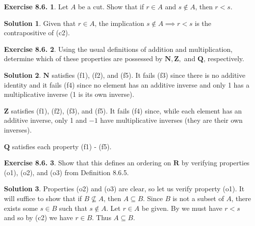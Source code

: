 \documentclass[12pt]{article}
\theoremstyle{definition}
\theoremstyle{exercise}
\newtheorem{exercise}{Exercise 8.6.}
\theoremstyle{solution}
\newtheorem*{solution}{Solution}
\newcommand{\N}{\mathbf{N}}
\newcommand{\Z}{\mathbf{Z}}
\newcommand{\Q}{\mathbf{Q}}
\newcommand{\R}{\mathbf{R}}
\begin{document}
\begin{exercise}
\label{ex:2}
    Let \( A \) be a cut. Show that if \( r \in A \) and \( s \not\in A \), then \( r < s \).
\end{exercise}

\begin{solution}
    Given that \( r \in A \), the implication \( s \not\in A \implies r < s \) is the contrapositive of (c2).
\end{solution}

\begin{exercise}
\label{ex:3}
    Using the usual definitions of addition and multiplication, determine which of these properties are possessed by \( \N, \Z, \) and \( \Q \), respectively.
\end{exercise}

\begin{solution}
    \( \N \) satisfies (f1), (f2), and (f5). It fails (f3) since there is no additive identity and it fails (f4) since no element has an additive inverse and only 1 has a multiplicative inverse (1 is its own inverse).

    \( \Z \) satisfies (f1), (f2), (f3), and (f5). It fails (f4) since, while each element has an additive inverse, only 1 and \( -1 \) have multiplicative inverses (they are their own inverses).

    \( \Q \) satisfies each property (f1) - (f5).
\end{solution}

\begin{exercise}
\label{ex:4}
    Show that this defines an ordering on \( \R \) by verifying properties (o1), (o2), and (o3) from Definition 8.6.5.
\end{exercise}

\begin{solution}
    Properties (o2) and (o3) are clear, so let us verify property (o1). It will suffice to show that if \( B \not\subseteq A \), then \( A \subseteq B \). Since \( B \) is not a subset of \( A \), there exists some \( s \in B \) such that \( s \not\in A \). Let \( r \in A \) be given. By  we must have \( r < s \) and so by (c2) we have \( r \in B \). Thus \( A \subseteq B \).
\end{solution}
\end{document}
